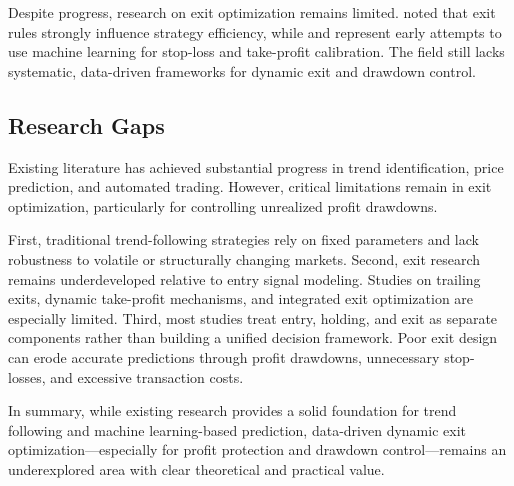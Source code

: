 \documentclass[12pt]{article}
\begin{document}
Despite progress, research on exit optimization remains limited. \citet{HwangEtAl2023} noted that exit rules strongly influence strategy efficiency, while \citet{SivriEtAl2023} and \citet{Shawky2023} represent early attempts to use machine learning for stop-loss and take-profit calibration. The field still lacks systematic, data-driven frameworks for dynamic exit and drawdown control.

\subsection{Research Gaps}

Existing literature has achieved substantial progress in trend identification, price prediction, and automated trading. However, critical limitations remain in exit optimization, particularly for controlling unrealized profit drawdowns.

First, traditional trend-following strategies rely on fixed parameters and lack robustness to volatile or structurally changing markets. Second, exit research remains underdeveloped relative to entry signal modeling. Studies on trailing exits, dynamic take-profit mechanisms, and integrated exit optimization are especially limited. Third, most studies treat entry, holding, and exit as separate components rather than building a unified decision framework. Poor exit design can erode accurate predictions through profit drawdowns, unnecessary stop-losses, and excessive transaction costs.

In summary, while existing research provides a solid foundation for trend following and machine learning-based prediction, data-driven dynamic exit optimization—especially for profit protection and drawdown control—remains an underexplored area with clear theoretical and practical value.



\end{document}
